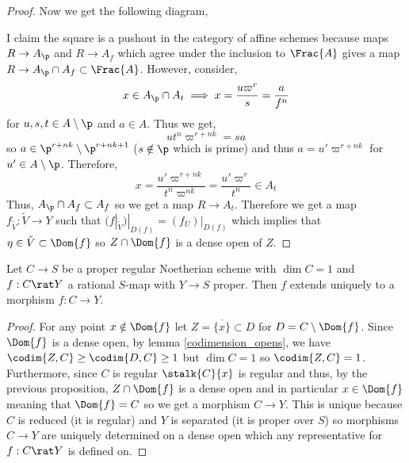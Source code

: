 \documentclass[12pt]{article}
\begin{document}
\begin{proof}
Now we get the following diagram, 
\begin{center}
\end{center}
I claim the square is a pushout in the category of affine schemes because maps $R \to A_\p$ and $R \to A_f$ which agree under the inclusion to $\Frac{A}$ gives a map $R \to A_\p \cap A_f \subset \Frac{A}$. However, consider,
\[ x \in A_\p \cap A_t \implies x = \frac{u \varpi^r}{s} = \frac{a}{f^n} \]
for $u, s, t \in A \setminus \p$ and $a \in A$. Thus we get,
\[ u t^n \varpi^{r + nk} = s a \]
so $a \in \p^{r + nk} \setminus \p^{r + nk + 1}$ ($s \notin \p$ which is prime) and thus $a = u' \varpi^{r + nk}$ for $u' \in A \setminus \p$. Therefore,
\[ x = \frac{u' \varpi^{r + nk}}{t^n \varpi^{nk}} = \frac{u' \varpi^{r}}{t^n} \in A_t \]
Thus, $A_\p \cap A_f \subset A_f$ so we get a map $R \to A_t$. Therefore we get a map $f_{\tilde{V}} : \tilde{V} \to Y$ such that $(f|_{\tilde{V}})|_{D(f)} = (f_U)|_{D(f)}$ which implies that $\eta \in \tilde{V} \subset \Dom{f}$ so $Z \cap \Dom{f}$ is a dense open of $Z$. 
\end{proof}

\begin{prop}
Let $C \to S$ be a proper regular Noetherian scheme with $\dim{C} = 1$ and $f : C \rat Y$ a rational $S$-map with $Y \to S$ proper. Then $f$ extends uniquely to a morphism $f : C \to Y$. 
\end{prop}

\begin{proof}
For any point $x \notin \Dom{f}$ let $Z = \overline{\{ x \}} \subset D$ for $D = C \setminus \Dom{f}$. Since $\Dom{f}$ is a dense open, by lemma \ref{codimension_opens}, we have $\codim{Z, C} \ge \codim{D, C} \ge 1$ but $\dim{C} = 1$ so $\codim{Z, C} = 1$. Furthermore, since $C$ is regular $\stalk{C}{x}$ is regular and thus, by the previous proposition, $Z \cap \Dom{f}$ is a dense open and in particular $x \in \Dom{f}$ meaning that $\Dom{f} = C$ so we get a morphism $C \to Y$. This is unique because $C$ is reduced (it is regular) and $Y$ is separated (it is proper over $S$) so morphisms $C \to Y$ are uniquely determined on a dense open which any representative for $f : C \rat Y$ is defined on.   
\end{proof}
\end{document}
